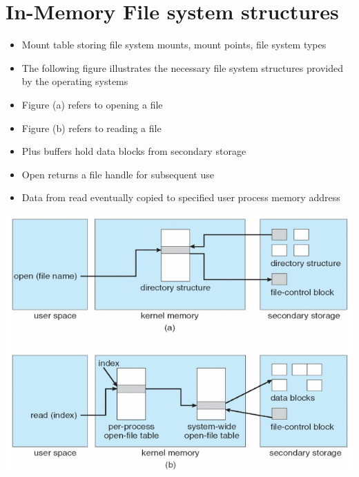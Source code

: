 \documentclass{article}[18pt]
\begin{document}
\section{In-Memory File system structures}
\begin{itemize}
	\item Mount table storing file system mounts, mount points, file system types
	\item The following figure illustrates the necessary file system structures provided by the operating systems
	\item Figure (a) refers to opening a file
	\item Figure (b) refers to reading a file
	\item Plus buffers hold data blocks from secondary storage
	\item Open returns a file handle for subsequent use
	\item Data from read eventually copied to specified user process memory address
\end{itemize}
\begin{center}
	\includegraphics[scale=0.7]{Structure}
\end{center}
\end{document}
